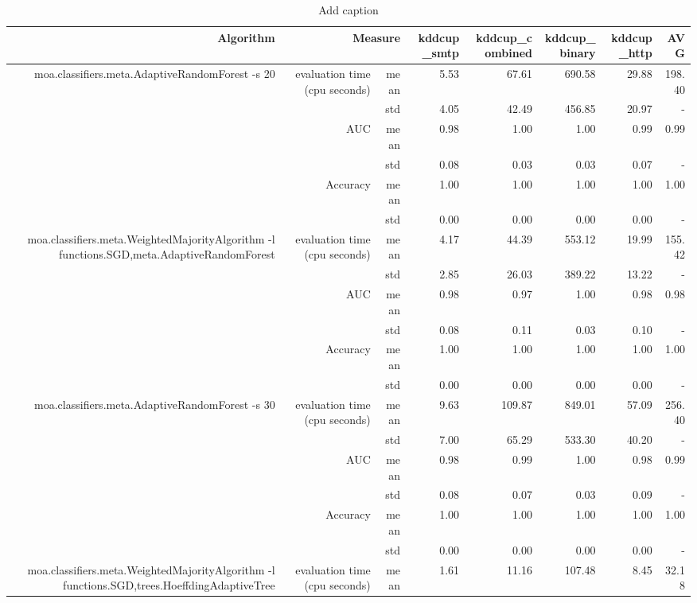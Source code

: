\documentclass{article}
\begin{document}
\begin{table}[htbp]
\caption{Add caption}\begin{tabular}{rrrrrrrr}
\toprule
Algorithm & \multicolumn{2}{r}{Measure}& kddcup_smtp& kddcup_combined& kddcup_binary& kddcup_http& AVG\\
\midrule
\multirow{6}[6]{*}{moa.classifiers.meta.AdaptiveRandomForest -s 20}&\multirow{2}[4]{*}{evaluation time (cpu seconds)} & mean & 5.53 & 67.61 & 690.58 & 29.88& 198.40\\
 & & std & 4.05 & 42.49 & 456.85 & 20.97 & -\\
&\multirow{2}[4]{*}{AUC} & mean & 0.98 & 1.00 & 1.00 & 0.99& 0.99\\
 & & std & 0.08 & 0.03 & 0.03 & 0.07 & -\\
&\multirow{2}[4]{*}{Accuracy} & mean & 1.00 & 1.00 & 1.00 & 1.00& 1.00\\
 & & std & 0.00 & 0.00 & 0.00 & 0.00 & -\\
\multirow{6}[6]{*}{moa.classifiers.meta.WeightedMajorityAlgorithm -l functions.SGD,meta.AdaptiveRandomForest}&\multirow{2}[4]{*}{evaluation time (cpu seconds)} & mean & 4.17 & 44.39 & 553.12 & 19.99& 155.42\\
 & & std & 2.85 & 26.03 & 389.22 & 13.22 & -\\
&\multirow{2}[4]{*}{AUC} & mean & 0.98 & 0.97 & 1.00 & 0.98& 0.98\\
 & & std & 0.08 & 0.11 & 0.03 & 0.10 & -\\
&\multirow{2}[4]{*}{Accuracy} & mean & 1.00 & 1.00 & 1.00 & 1.00& 1.00\\
 & & std & 0.00 & 0.00 & 0.00 & 0.00 & -\\
\multirow{6}[6]{*}{moa.classifiers.meta.AdaptiveRandomForest -s 30}&\multirow{2}[4]{*}{evaluation time (cpu seconds)} & mean & 9.63 & 109.87 & 849.01 & 57.09& 256.40\\
 & & std & 7.00 & 65.29 & 533.30 & 40.20 & -\\
&\multirow{2}[4]{*}{AUC} & mean & 0.98 & 0.99 & 1.00 & 0.98& 0.99\\
 & & std & 0.08 & 0.07 & 0.03 & 0.09 & -\\
&\multirow{2}[4]{*}{Accuracy} & mean & 1.00 & 1.00 & 1.00 & 1.00& 1.00\\
 & & std & 0.00 & 0.00 & 0.00 & 0.00 & -\\
\multirow{6}[6]{*}{moa.classifiers.meta.WeightedMajorityAlgorithm -l functions.SGD,trees.HoeffdingAdaptiveTree}&\multirow{2}[4]{*}{evaluation time (cpu seconds)} & mean & 1.61 & 11.16 & 107.48 & 8.45& 32.18\\

\end{tabular}
\end{table}
\end{document}
